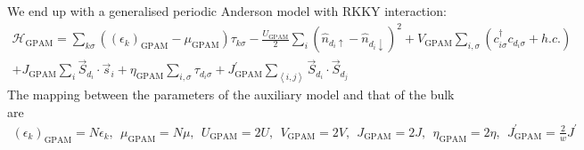 \documentclass{report}
\numberwithin{equation}{section}
\begin{document}
We end up with a generalised periodic Anderson model with RKKY interaction:
\begin{equation}\begin{aligned}
	\mathcal{H}_\text{GPAM} = \sum_{k\sigma}\left(\left(\epsilon_k\right)_\text{GPAM} - \mu_\text{GPAM}\right)\tau_{k\sigma} - \frac{U_\text{GPAM}}{2}\sum_{i}\left(\hat n_{d_i \uparrow} - \hat n_{d_i \downarrow} \right) ^2 + V_\text{GPAM} \sum_{i,\sigma} \left(c^\dagger_{i\sigma} c_{d_i\sigma} + h.c.\right)\\
	+ J_\text{GPAM} \sum_i\vec{S}_{d_i}\cdot\vec{s}_i + \eta_\text{GPAM} \sum_{i,\sigma}\tau_{d_i\sigma} + J^\prime_\text{GPAM}\sum_{\left<i,j\right>}\vec{S}_{d_i}\cdot\vec{S}_{d_j}
\end{aligned}\end{equation}
The mapping between the parameters of the auxiliary model and that of the bulk are
\begin{equation}\begin{aligned}
	\left(\epsilon_k\right)_\text{GPAM} = N\epsilon_k, ~ ~ \mu_\text{GPAM} = N\mu, ~ ~ U_\text{GPAM} = 2U, ~ ~ V_\text{GPAM} = 2V, ~ ~ J_\text{GPAM} = 2J, ~ ~ \eta_\text{GPAM} = 2\eta, ~ ~ J^\prime_\text{GPAM} = \frac{2}{w}J^\prime
\end{aligned}\end{equation}
\end{document}
